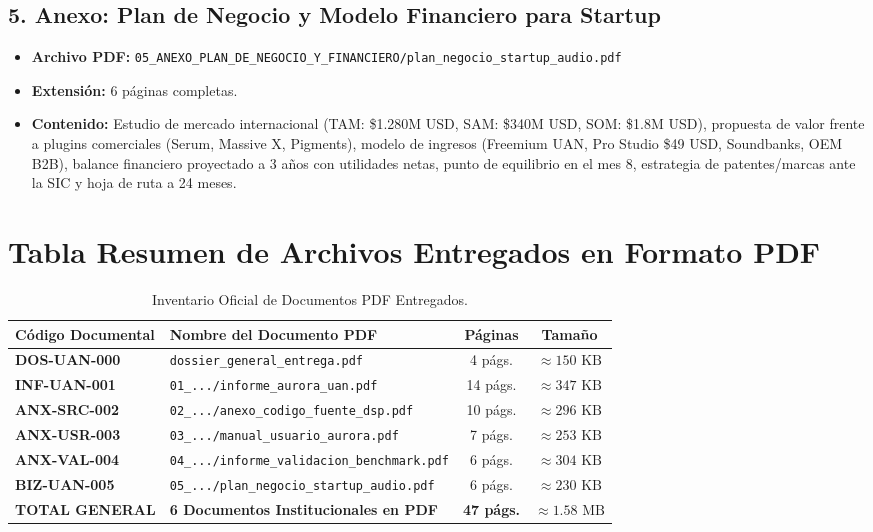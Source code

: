 \documentclass[11pt,a4paper]{article}
\begin{document}
\subsection{5. Anexo: Plan de Negocio y Modelo Financiero para Startup}
\begin{itemize}[leftmargin=1.5cm]
    \item \textbf{Archivo PDF:} \texttt{05\_ANEXO\_PLAN\_DE\_NEGOCIO\_Y\_FINANCIERO/plan\_negocio\_startup\_audio.pdf}
    \item \textbf{Extensión:} 6 páginas completas.
    \item \textbf{Contenido:} Estudio de mercado internacional (TAM: \$1.280M USD, SAM: \$340M USD, SOM: \$1.8M USD), propuesta de valor frente a plugins comerciales (Serum, Massive X, Pigments), modelo de ingresos (Freemium UAN, Pro Studio \$49 USD, Soundbanks, OEM B2B), balance financiero proyectado a 3 años con utilidades netas, punto de equilibrio en el mes 8, estrategia de patentes/marcas ante la SIC y hoja de ruta a 24 meses.
\end{itemize}

\section{Tabla Resumen de Archivos Entregados en Formato PDF}

\begin{table}[h!]
\centering
\caption{Inventario Oficial de Documentos PDF Entregados.}
\label{tab:pdf_inventory}
\vspace{0.2cm}
{\footnotesize
\begin{tabular}{llcc}
\toprule
\textbf{Código Documental} & \textbf{Nombre del Documento PDF} & \textbf{Páginas} & \textbf{Tamaño} \\
\midrule
\textbf{DOS-UAN-000} & \texttt{dossier\_general\_entrega.pdf} & 4 págs. & $\approx 150\text{ KB}$ \\
\textbf{INF-UAN-001} & \texttt{01\_.../informe\_aurora\_uan.pdf} & 14 págs. & $\approx 347\text{ KB}$ \\
\textbf{ANX-SRC-002} & \texttt{02\_.../anexo\_codigo\_fuente\_dsp.pdf} & 10 págs. & $\approx 296\text{ KB}$ \\
\textbf{ANX-USR-003} & \texttt{03\_.../manual\_usuario\_aurora.pdf} & 7 págs. & $\approx 253\text{ KB}$ \\
\textbf{ANX-VAL-004} & \texttt{04\_.../informe\_validacion\_benchmark.pdf} & 6 págs. & $\approx 304\text{ KB}$ \\
\textbf{BIZ-UAN-005} & \texttt{05\_.../plan\_negocio\_startup\_audio.pdf} & 6 págs. & $\approx 230\text{ KB}$ \\
\midrule
\textbf{TOTAL GENERAL} & \textbf{6 Documentos Institucionales en PDF} & \textbf{47 págs.} & \textbf{$\approx 1.58\text{ MB}$} \\
\bottomrule
\end{tabular}
}
\end{table}
\end{document}
